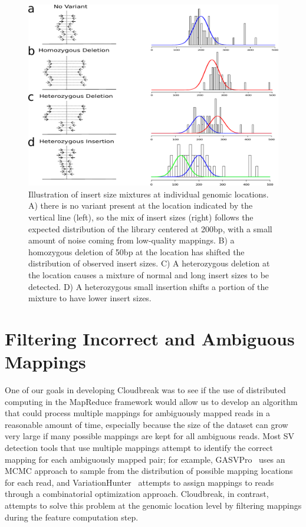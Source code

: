 \begin{figure}
\centering
\includegraphics[width=.9\textwidth]{figures/insert_size_mixtures.pdf}
\caption{Illustration of insert size mixtures at individual genomic locations. A) there is no variant present at the location indicated by the vertical line (left), so the mix of insert sizes (right) follows the expected distribution of the library centered at 200bp, with a small amount of noise coming from low-quality mappings. B) a homozygous deletion of 50bp at the location has shifted the distribution of observed insert sizes. C) A heterozygous deletion at the location causes a mixture of normal and long insert sizes to be detected. D) A heterozygous small insertion shifts a portion of the mixture to have lower insert sizes.}
\label{insert_size_mixes}
\end{figure}

\section{Filtering Incorrect and Ambiguous Mappings}\label{section_incorrect_and_ambiguous_mappings}

One of our goals in developing Cloudbreak was to see if the use of distributed computing in the MapReduce framework would allow us to develop an algorithm that could process multiple mappings for ambiguously mapped reads in a reasonable amount of time, especially because the size of the dataset can grow very large if many possible mappings are kept for all ambiguous reads. Most SV detection tools that use multiple mappings attempt to identify the correct mapping for each ambiguously mapped pair; for example, GASVPro~\cite{Sindi:2012kk} uses an MCMC approach to sample from the distribution of possible mapping locations for each read, and VariationHunter~\cite{Hormozdiari:2009p284} attempts to assign mappings to reads through a combinatorial optimization approach. Cloudbreak, in contrast, attempts to solve this problem at the genomic location level by filtering mappings during the feature computation step.

